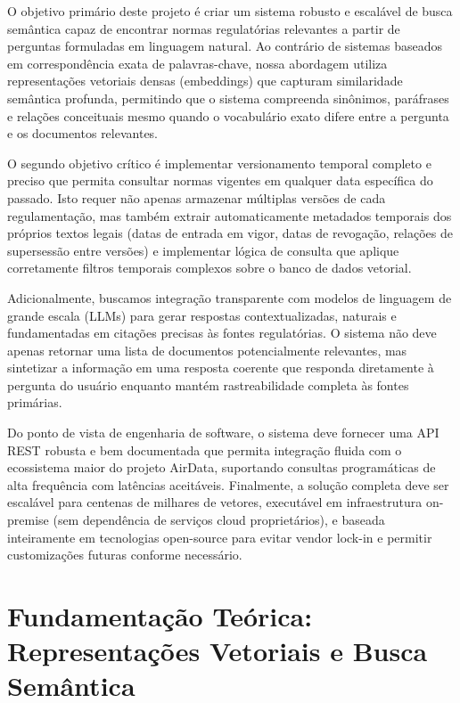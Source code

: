 \documentclass[12pt,a4paper]{article}
\begin{document}
O objetivo primário deste projeto é criar um sistema robusto e escalável de busca semântica capaz de encontrar normas regulatórias relevantes a partir de perguntas formuladas em linguagem natural. Ao contrário de sistemas baseados em correspondência exata de palavras-chave, nossa abordagem utiliza representações vetoriais densas (embeddings) que capturam similaridade semântica profunda, permitindo que o sistema compreenda sinônimos, paráfrases e relações conceituais mesmo quando o vocabulário exato difere entre a pergunta e os documentos relevantes.

O segundo objetivo crítico é implementar versionamento temporal completo e preciso que permita consultar normas vigentes em qualquer data específica do passado. Isto requer não apenas armazenar múltiplas versões de cada regulamentação, mas também extrair automaticamente metadados temporais dos próprios textos legais (datas de entrada em vigor, datas de revogação, relações de supersessão entre versões) e implementar lógica de consulta que aplique corretamente filtros temporais complexos sobre o banco de dados vetorial.

Adicionalmente, buscamos integração transparente com modelos de linguagem de grande escala (LLMs) para gerar respostas contextualizadas, naturais e fundamentadas em citações precisas às fontes regulatórias. O sistema não deve apenas retornar uma lista de documentos potencialmente relevantes, mas sintetizar a informação em uma resposta coerente que responda diretamente à pergunta do usuário enquanto mantém rastreabilidade completa às fontes primárias.

Do ponto de vista de engenharia de software, o sistema deve fornecer uma API REST robusta e bem documentada que permita integração fluida com o ecossistema maior do projeto AirData, suportando consultas programáticas de alta frequência com latências aceitáveis. Finalmente, a solução completa deve ser escalável para centenas de milhares de vetores, executável em infraestrutura on-premise (sem dependência de serviços cloud proprietários), e baseada inteiramente em tecnologias open-source para evitar vendor lock-in e permitir customizações futuras conforme necessário.

\section{Fundamentação Teórica: Representações Vetoriais e Busca Semântica}
\end{document}
